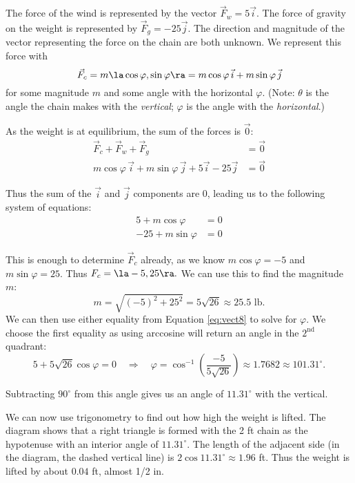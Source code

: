 {The force of the wind is represented by the vector $\vec F_w = 5\vec i$. The force of gravity on the weight is represented by $\vec F_g = -25\vec j$. The direction and magnitude of the vector representing the force on the chain are both unknown. We represent this force with 
\[
\vec F_c = m\la \cos\varphi,\sin\varphi\ra = m\cos\varphi\, \vec i + m\sin\varphi\,\vec j
\]
for some magnitude $m$ and some angle with the horizontal $\varphi$. (Note: $\theta$ is the angle the chain makes with the \emph{vertical}; $\varphi$ is the angle with the \emph{horizontal}.)

As the weight is at equilibrium, the sum of the forces is $\vec0$:
\begin{align*}
\vec F_c + \vec F_w + \vec F_g &= \vec 0\\
m\cos\varphi\, \vec i + m\sin\varphi\,\vec j + 5\vec i - 25\vec j &=\vec 0
\end{align*}

 Thus the sum of the $\vec i$ and $\vec j$ components are 0, leading us to the following system of equations:
\begin{equation}
\begin{split}
5+m\cos\varphi &= 0\\
-25+m\sin\varphi &= 0
\end{split}\label{eq:vect8}
\end{equation}

This is enough to determine $\vec F_c$ already, as we know $m\cos \varphi = -5$ and $m\sin\varphi =25$. Thus $F_c = \la -5,25\ra.$ We can use this to find the magnitude $m$:
\[
m = \sqrt{(-5)^2+25^2} = 5\sqrt{26}\approx 25.5\text{ lb}.
\]
We can then use either equality from Equation \eqref{eq:vect8} to solve for $\varphi$. We choose the first equality as using arccosine will return an angle in the $2^\text{nd}$ quadrant:
\[
5 + 5\sqrt{26}\cos \varphi = 0 \quad \Rightarrow \quad \varphi = \cos^{-1}\left(\frac{-5}{5\sqrt{26}}\right) \approx 1.7682\approx 101.31^\circ.
\]

Subtracting $90^\circ$ from this angle gives us an angle of $11.31^\circ$ with the vertical.

We can now use trigonometry to find out how high the weight is lifted. The diagram shows that a right triangle is formed with the 2 ft chain as the hypotenuse with an interior angle of $11.31^\circ$. The length of the adjacent side (in the diagram, the dashed vertical line) is $2\cos 11.31^\circ \approx 1.96$ ft. Thus the weight is lifted by about $0.04$ ft, almost 1/2 in.
}\\

